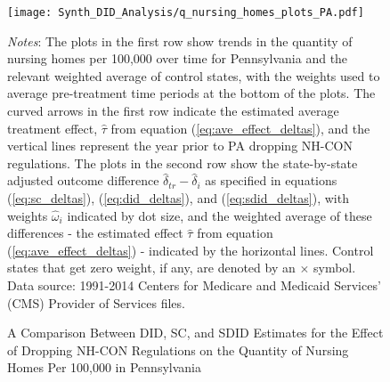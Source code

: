 \documentclass[../Main.tex]{subfiles}
\begin{document}
\newpage
\begin{figure}[t] 
	\begin{center}
	\caption{\label{fig:q_nh_plots_pa} \centering A Comparison Between DID, SC, and SDID Estimates for the Effect of Dropping NH-CON Regulations on the Quantity of Nursing Homes Per 100,000 in Pennsylvania}
    \texttt{[image: Synth\_DID\_Analysis/q\_nursing\_homes\_plots\_PA.pdf]}
    \end{center}
    \footnotesize
		\textit{Notes}: The plots in the first row show trends in the quantity of nursing homes per 100,000 over time for Pennsylvania and the relevant weighted average of control states, with the weights used to average pre-treatment time periods at the bottom of the plots. The curved arrows in the first row indicate the estimated average treatment effect, $\hat{\tau}$ from equation (\ref{eq:ave_effect_deltas}), and the vertical lines represent the year prior to PA dropping NH-CON regulations. The plots in the second row show the state-by-state adjusted outcome difference $\hat{\delta}_{tr}-\hat{\delta}_i$ as specified in equations (\ref{eq:sc_deltas}), (\ref{eq:did_deltas}), and (\ref{eq:sdid_deltas}), with weights $\hat{\omega}_i$ indicated by dot size, and the weighted average of these differences - the estimated effect $\hat{\tau}$ from equation (\ref{eq:ave_effect_deltas}) - indicated by the horizontal lines. Control states that get zero weight, if any, are denoted by an $\times$ symbol. Data source: 1991-2014 Centers for Medicare and Medicaid Services’ (CMS) Provider of Services files.
\end{figure}
\clearpage
\end{document}
